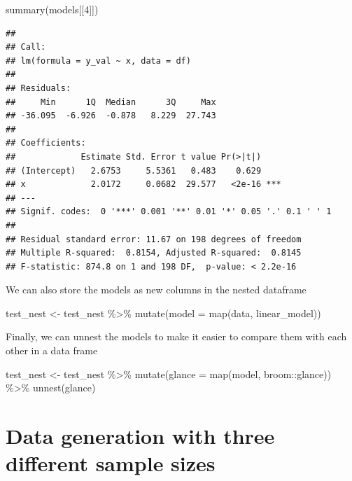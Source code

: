 \documentclass[
]{book}
\newenvironment{Shaded}{\begin{snugshade}}{\end{snugshade}}
\newcommand{\AttributeTok}[1]{\textcolor[rgb]{0.77,0.63,0.00}{#1}}
\newcommand{\DecValTok}[1]{\textcolor[rgb]{0.00,0.00,0.81}{#1}}
\newcommand{\FunctionTok}[1]{\textcolor[rgb]{0.00,0.00,0.00}{#1}}
\newcommand{\NormalTok}[1]{#1}
\newcommand{\OtherTok}[1]{\textcolor[rgb]{0.56,0.35,0.01}{#1}}
\newcommand{\SpecialCharTok}[1]{\textcolor[rgb]{0.00,0.00,0.00}{#1}}
\begin{document}
\begin{Shaded}
\begin{Highlighting}[]
\FunctionTok{summary}\NormalTok{(models[[}\DecValTok{4}\NormalTok{]])}
\end{Highlighting}
\end{Shaded}

\begin{verbatim}
## 
## Call:
## lm(formula = y_val ~ x, data = df)
## 
## Residuals:
##     Min      1Q  Median      3Q     Max 
## -36.095  -6.926  -0.878   8.229  27.743 
## 
## Coefficients:
##             Estimate Std. Error t value Pr(>|t|)    
## (Intercept)   2.6753     5.5361   0.483    0.629    
## x             2.0172     0.0682  29.577   <2e-16 ***
## ---
## Signif. codes:  0 '***' 0.001 '**' 0.01 '*' 0.05 '.' 0.1 ' ' 1
## 
## Residual standard error: 11.67 on 198 degrees of freedom
## Multiple R-squared:  0.8154, Adjusted R-squared:  0.8145 
## F-statistic: 874.8 on 1 and 198 DF,  p-value: < 2.2e-16
\end{verbatim}

We can also store the models as new columns in the nested dataframe

\begin{Shaded}
\begin{Highlighting}[]
\NormalTok{test\_nest }\OtherTok{\textless{}{-}}\NormalTok{ test\_nest }\SpecialCharTok{\%\textgreater{}\%} 
  \FunctionTok{mutate}\NormalTok{(}\AttributeTok{model =} \FunctionTok{map}\NormalTok{(data, linear\_model))}
\end{Highlighting}
\end{Shaded}

Finally, we can unnest the models to make it easier to compare them with each other in a data frame

\begin{Shaded}
\begin{Highlighting}[]
\NormalTok{test\_nest }\OtherTok{\textless{}{-}}\NormalTok{ test\_nest }\SpecialCharTok{\%\textgreater{}\%} 
  \FunctionTok{mutate}\NormalTok{(}\AttributeTok{glance =} \FunctionTok{map}\NormalTok{(model, broom}\SpecialCharTok{::}\NormalTok{glance)) }\SpecialCharTok{\%\textgreater{}\%} 
  \FunctionTok{unnest}\NormalTok{(glance)}
\end{Highlighting}
\end{Shaded}

\hypertarget{data-generation-with-three-different-sample-sizes}{%
\section{Data generation with three different sample sizes}\label{data-generation-with-three-different-sample-sizes}}
\end{document}
